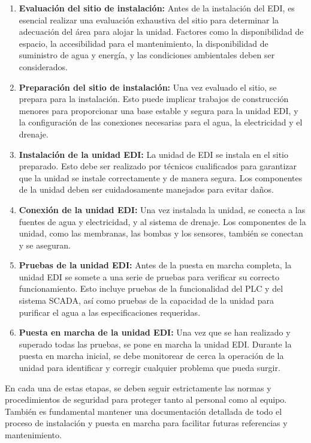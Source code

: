 \begin{enumerate}
    \item \textbf{Evaluación del sitio de instalación:} Antes de la instalación del EDI, es esencial realizar una evaluación exhaustiva del sitio para determinar la adecuación del área para alojar la unidad. Factores como la disponibilidad de espacio, la accesibilidad para el mantenimiento, la disponibilidad de suministro de agua y energía, y las condiciones ambientales deben ser considerados.

    \item \textbf{Preparación del sitio de instalación:} Una vez evaluado el sitio, se prepara para la instalación. Esto puede implicar trabajos de construcción menores para proporcionar una base estable y segura para la unidad EDI, y la configuración de las conexiones necesarias para el agua, la electricidad y el drenaje.

    \item \textbf{Instalación de la unidad EDI:} La unidad de EDI se instala en el sitio preparado. Esto debe ser realizado por técnicos cualificados para garantizar que la unidad se instale correctamente y de manera segura. Los componentes de la unidad deben ser cuidadosamente manejados para evitar daños.

    \item \textbf{Conexión de la unidad EDI:} Una vez instalada la unidad, se conecta a las fuentes de agua y electricidad, y al sistema de drenaje. Los componentes de la unidad, como las membranas, las bombas y los sensores, también se conectan y se aseguran.

    \item \textbf{Pruebas de la unidad EDI:} Antes de la puesta en marcha completa, la unidad EDI se somete a una serie de pruebas para verificar su correcto funcionamiento. Esto incluye pruebas de la funcionalidad del PLC y del sistema SCADA, así como pruebas de la capacidad de la unidad para purificar el agua a las especificaciones requeridas.

    \item \textbf{Puesta en marcha de la unidad EDI:} Una vez que se han realizado y superado todas las pruebas, se pone en marcha la unidad EDI. Durante la puesta en marcha inicial, se debe monitorear de cerca la operación de la unidad para identificar y corregir cualquier problema que pueda surgir.
\end{enumerate}

En cada una de estas etapas, se deben seguir estrictamente las normas y procedimientos de seguridad para proteger tanto al personal como al equipo. También es fundamental mantener una documentación detallada de todo el proceso de instalación y puesta en marcha para facilitar futuras referencias y mantenimiento.
